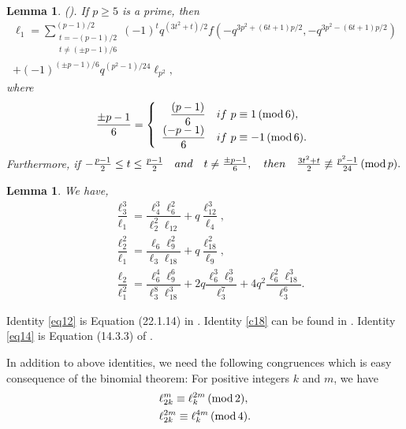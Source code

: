 \documentclass[12pt]{article}
\def\+{\;\lower\plusheight\hbox{$+$}\;}
\renewcommand{\(}{\left\(}
\renewcommand{\)}{\right\)}
\renewcommand{\[}{\left[}
\renewcommand{\]}{\right]}
\renewcommand{\pmod}[1]{\,(\textup{mod}\,#1)}
\numberwithin{equation}{section}
\theoremstyle{plain}
\newtheorem{lemma}[theorem]{Lemma}
\begin{document}
		\begin{lemma}(\cite[Theorem 2.2]{CG}). If $p\geq5$ is a prime, then
		\begin{multline}\label{eq8}
		\ell_1 = \sum_{\substack{t={-(p-1)/2} \\ t \ne {(\pm p-1)/6}}}^{(p-1)/2} (-1)^{t} q^{(3t^{2}+t)/2} f\left(-q^{3p^{2}+(6t+1)p/2}, -q^{3p^{2}-(6t+1)p/2}\right)\\+ (-1)^{(\pm p-1)/6} q^{(p^{2}-1)/24} \ell_{p^2},
		\end{multline} where
		\begin{equation*}
		\dfrac{\pm p-1}{6}
		= \left\{
		\begin{array}{cc}
		\dfrac{(p-1)}{6} \quad
		 if~ p \equiv 1\pmod{6}, \\
		\dfrac{(-p-1)}{6} \quad
		 if~ p \equiv -1\pmod{6}.
		\end{array}
		\right.
		\end{equation*} Furthermore, if $-\frac{p-1}{2} \leq t \leq \frac{p-1}{2} \quad and \quad t \ne \frac{\pm p-1}{6}, \quad then  \quad \frac{3t^{2}+t}{2} \not\equiv \frac{p^{2}-1}{24} \pmod{p}.$
		
		\end{lemma}
		
		\begin{lemma} We have,
		\begin{align}
		\label{eq12}
		&\dfrac{\ell_3^3}{\ell_1} = \dfrac{\ell_{4}^3 \ell_6^2}{\ell_2^2 \ell_{12}} + q\dfrac{\ell_{12}^3}{\ell_4},\\
		\label{eq14}
		&\dfrac{\ell_2^2}{\ell_1} = \dfrac{\ell_6 \ell_9^2}{\ell_3 \ell_{18}} + q\dfrac{\ell_{18}^2}{\ell_9},\\
		\label{c18} 
		&\dfrac{\ell_2}{\ell_1^2}=\dfrac{\ell_6^4 \ell_9^6}{\ell_3^8 \ell_{18}^3}+2q\dfrac{\ell_6^3 \ell_9^3}{\ell_3^7}+4q^2\dfrac{\ell_6^2 \ell_{18}^3}{\ell_3^6}.
		\end{align}
		\end{lemma}
 Identity \eqref{eq12} is Equation (22.1.14) in \cite{HD}. Identity \eqref{c18} can be found in \cite{HD}. Identity \eqref{eq14} is Equation (14.3.3) of \cite{HD}.
		

In addition to above identities, we need the following congruences which is easy consequence of the binomial theorem: 
  For positive integers $k$ and $m$, we have
\begin{align}\label{lm1}
&\ell_{2k}^{m} \equiv \ell_{k}^{2m}\pmod{2},\\
\label{lm2}
&\ell_{2k}^{2m} \equiv \ell_{k}^{4m}\pmod{4}.
\end{align}	 
\end{document}
